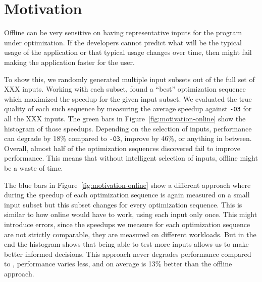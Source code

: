 \section{Motivation}

Offline \itercomp can be very sensitive on having representative inputs for the program under optimization. If the
developers cannot predict what will be the typical usage of the application or that typical usage changes over time,
then \itercomp might fail making the application faster for the user.

To show this, we randomly generated multiple
input subsets out of the full set of XXX inputs. Working with each subset, \itercomp found a ``best'' optimization
sequence which maximized the speedup for the given input subset. We evaluated the true quality of each such sequence
by measuring the average speedup against \texttt{-O3} for all the XXX inputs. The green bars in
Figure~\ref{fig:motivation-online} show the histogram of those speedups. Depending on the selection of inputs,
performance can degrade by 18\% compared to \texttt{-O3}, improve by 46\%, or anything in between. Overall, almost half
of the optimization sequences discovered fail to improve performance. This means that without intelligent selection of
inputs, offline \itercomp might be a waste of time.

The blue bars in Figure~\ref{fig:motivation-online} show a different approach where during \itercomp the speedup of
each optimization sequence is again measured on a small input subset but this subset changes for every optimization
sequence. This is similar to how online \itercomp would have to work, using each input only once. This might introduce
errors, since the speedups we measure for each optimization sequence are not strictly comparable, they are measured on
different workloads. But in the end the histogram shows that being able to test more inputs allows us to make better
informed decisions. This approach never degrades performance compared to , performance varies less, and on
average is 13\% better than the offline approach. 


